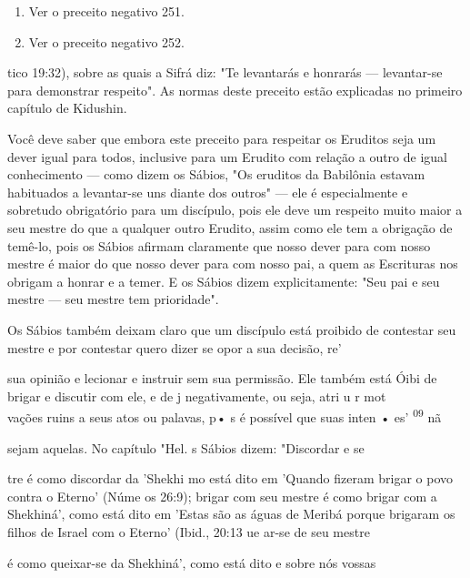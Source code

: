 \begin{itemize}
\begin{enumrate}
\begin{itemize}
\begin{itemize}
\begin{itemize}
\begin{enumerate}
\def\labelenumi{\arabic{enumi}.}
\setcounter{enumi}{206}
\item
 
 Ver o preceito negativo 251.
 
\item
 
 Ver o preceito negativo 252.
 
\end{enumerate}




tico 19:32), sobre as quais a Sifrá diz: "Te levantarás e honrarás ---
levantar-se para demonstrar respeito". As normas deste preceito estão
explicadas no pri­meiro capítulo de Kidushin.

Você deve saber que embora este preceito para respeitar os Erudi­tos
seja um dever igual para todos, inclusive para um Erudito com relação a
outro de igual conhecimento --- como dizem os Sábios, "Os eruditos da
Babi­lônia estavam habituados a levantar-se uns diante dos outros" ---
ele é especial­mente e sobretudo obrigatório para um discípulo, pois ele
deve um respeito muito maior a seu mestre do que a qualquer outro
Erudito, assim como ele tem a obrigação de temê-lo, pois os Sábios
afirmam claramente que nosso dever pa­ra com nosso mestre é maior do que
nosso dever para com nosso pai, a quem as Escrituras nos obrigam a
honrar e a temer. E os Sábios dizem explicitamente: "Seu pai e seu
mestre --- seu mestre tem prioridade".

Os Sábios também deixam claro que um discípulo está proibido de
contestar seu mestre e por contestar quero dizer se opor a sua decisão,
re'

sua opinião e lecionar e instruir sem sua permissão. Ele também está
Óibi de brigar e discutir com ele, e de j negativamente, ou seja, atri u
r mot\\
vações ruins a seus atos ou palavas, p• s é possível que suas inten •
es' \textsuperscript{09} nã

sejam aquelas. No capítulo "Hel. s Sábios dizem: "Discordar e se

tre é como discordar da 'Shekhi mo está dito em 'Quando fizeram brigar o
povo contra o Eterno' (Núme os 26:9); brigar com seu mestre é como
brigar com a Shekhiná', como está dito em 'Estas são as águas de Meribá
porque bri­garam os filhos de Israel com o Eterno' (Ibid., 20:13 ue
ar-se de seu mestre

é como queixar-se da Shekhiná', como está dito e sobre nós vossas


\end{itemize}
\end{itemize}
\end{itemize}
\end{enumrate}
\end{itemize}
